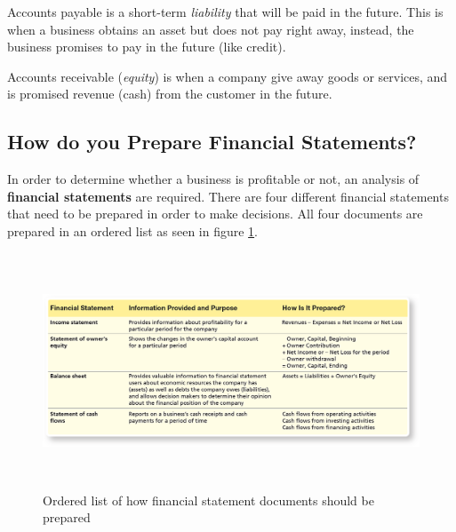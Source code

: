 \documentclass[a4paper, 12pt]{article}
\begin{document}
Accounts payable is a short-term \emph{liability} that will be paid in the future.
This is when a business obtains an asset but does not pay right away, instead,
the business promises to pay in the future (like credit).

Accounts receivable (\emph{equity}) is when a company give away goods or services, and is promised
revenue (cash) from the customer in the future.

\subsection{How do you Prepare Financial Statements?}
In order to determine whether a business is profitable or not, an analysis of 
\textbf{financial statements} are required. There are four different financial 
statements that need to be prepared in order to make decisions. All four documents
are prepared in an ordered list as seen in figure \ref{fig:fin_state1}.
\begin{figure}
    \centering
    \includegraphics[width=13.0cm, height=7.0cm]{financial_statements.png}
    \caption{Ordered list of how financial statement documents should be prepared}
    \label{fig:fin_state1}
\end{figure}
\end{document}
